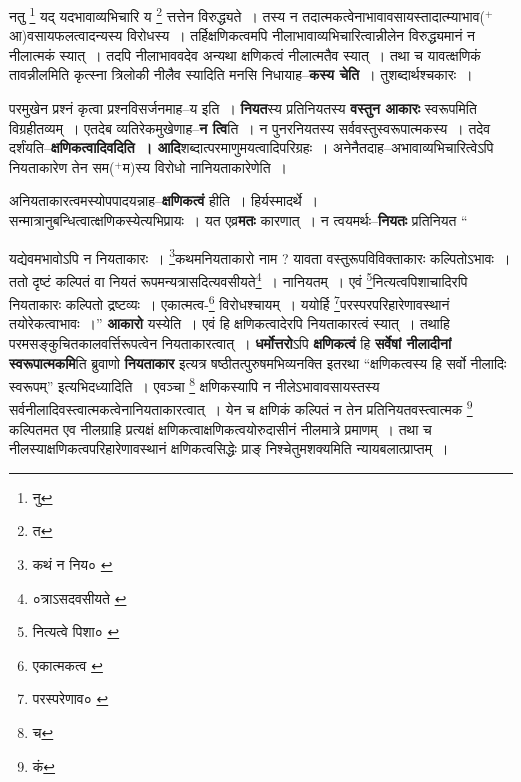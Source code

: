 \documentclass[article,12pt,a4paper]{memoir}
\newcommand{\add}[1]{($^{+}$#1)}
\begin{document}
	  \pstart नतु \footnote{नु} यद् यदभावाव्यभिचारि य \footnote{त} त्तत्तेन विरुद्ध्यते । तस्य न तदात्मकत्वेनाभावावसायस्तादात्म्याभाव\add{आ}वसायफलत्वादन्यस्य विरोधस्य । तर्हिक्षणिकत्वमपि नीलाभावाव्यभिचारित्वान्नीलेन विरुद्ध्यमानं न नीलात्मकं स्यात् । तदपि नीलाभाववदेव अन्यथा क्षणिकत्वं नीलात्मतैव स्यात् । तथा च यावत्क्षणिकं तावन्नीलमिति कृत्स्ना त्रिलोकी नीलैव स्यादिति मनसि निधायाह--\textbf{कस्य चेति} । तुशब्दार्थश्चकारः ।
	\pend
      

	  \pstart परमु\leavevmode{}खेन प्रश्नं कृत्वा प्रश्नविसर्जनमाह--य इति । \textbf{नियत}स्य प्रतिनियतस्य \textbf{वस्तुन आकारः} स्वरूपमिति विग्रहीतव्यम् । एतदेब व्यतिरेकमुखेणाह--\textbf{न त्वि}ति । न पुनरनियतस्य सर्ववस्तुस्वरूपात्मकस्य । तदेव दर्शंयति--\textbf{क्षणिकत्वादिवदिति । आदि}शब्दात्परमाणुमयत्वादिपरिग्रहः । अनेनैतदाह--अभावाव्यभिचारित्वेऽपि नियताकारेण तेन सम\add{म}स्य विरोधो नानियताकारेणेति ।
	\pend
      

	  \pstart अनियताकारत्वमस्योपपादयन्नाह--\textbf{क्षणिकत्वं} हीति । हिर्यस्मादर्थे । सन्मात्रानुबन्धित्वात्क्षणिकस्येत्यभिप्रायः । यत एव्र\textbf{मतः} कारणात् । न त्वयमर्थः--\textbf{नियतः} प्रतिनियत  \leavevmode{} “
	  
	यद्येवमभावोऽपि न नियताकारः । \footnote{कथं न निय० \cite{dp-msA} \cite{dp-msB} \cite{dp-edP} \cite{dp-edH} \cite{dp-edN}}\-कथमनियताकारो नाम ? यावता वस्तुरूपविविक्ताकारः कल्पितोऽभावः । ततो दृष्टं कल्पितं वा नियतं रूपमन्यत्रासदित्यवसीयते\footnote{०त्राऽसदवसीयते \cite{dp-msA} \cite{dp-msB} \cite{dp-msD} \cite{dp-edP} \cite{dp-edH} \cite{dp-edE} \cite{dp-edN}} । नानियतम् । एवं \footnote{नित्यत्वे पिशा० \cite{dp-msA} \cite{dp-edP} \cite{dp-edH}}\-नित्यत्वपिशाचादिरपि नियताकारः कल्पितो द्रष्टव्यः । एकात्मत्व-\footnote{एकात्मकत्व \cite{dp-msA} \cite{dp-msB} \cite{dp-msC} \cite{dp-msD} \cite{dp-edP} \cite{dp-edH} \cite{dp-edE} \cite{dp-edN}} विरोधश्चायम् । ययोर्हि \footnote{परस्परेणाव० \cite{dp-msB}}\-परस्परपरिहारेणावस्थानं तयोरेकत्वाभावः ।” \textbf{आकारो} यस्येति । एवं हि क्षणिकत्वादेरपि नियताकारत्वं स्यात् । तथाहि परमसङ्कुचितकालवर्त्तिरूपत्वेन नियताकारत्वात् । \textbf{धर्मोत्तरो}ऽपि \textbf{क्षणिकत्वं} हि \textbf{सर्वेषां नीलादीनां स्वरूपात्मकमि}ति ब्रुवाणो \textbf{नियताकार} इत्यत्र षष्ठीतत्पुरुषमभिव्यनक्ति इतरथा “क्षणिकत्वस्य हि सर्वो नीलादिः स्वरूपम्” इत्यभिदध्यादिति । एवञ्चा \footnote{च} क्षणिकस्यापि न नीलेऽभावावसायस्तस्य सर्वनीलादिवस्त्वात्मकत्वेनानियताकारत्वात् । येन च क्षणिकं कल्पितं न तेन प्रतिनियतवस्त्वात्मक \footnote{कं} कल्पितमत एव नीलग्राहि प्रत्यक्षं क्षणिकत्वाक्षणिकत्वयोरुदासीनं नीलमात्रे प्रमाणम् । तथा च नीलस्याक्षणिकत्वपरिहारेणावस्थानं क्षणिकत्वसिद्धेः प्राङ् निश्चेतुमशक्यमिति न्यायबलात्प्राप्तम् ।
	\pend
      
\end{document}
